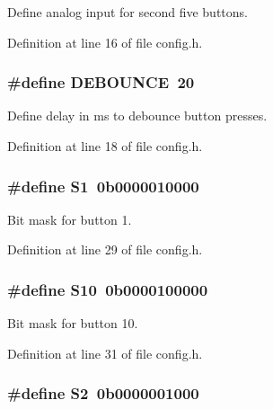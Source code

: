 Define analog input for second five buttons. 



Definition at line 16 of file config.\+h.

\subsubsection[{\texorpdfstring{D\+E\+B\+O\+U\+N\+CE}{DEBOUNCE}}]{\setlength{\rightskip}{0pt plus 5cm}\#define D\+E\+B\+O\+U\+N\+CE~20}\hypertarget{group__buttons_ga171ef18ea7b584f85234640a918da857}{}\label{group__buttons_ga171ef18ea7b584f85234640a918da857}


Define delay in ms to debounce button presses. 



Definition at line 18 of file config.\+h.

\subsubsection[{\texorpdfstring{S1}{S1}}]{\setlength{\rightskip}{0pt plus 5cm}\#define S1~0b0000010000}\hypertarget{group__buttons_ga690d30e9ad3647835c243368b36d4c41}{}\label{group__buttons_ga690d30e9ad3647835c243368b36d4c41}


Bit mask for button 1. 



Definition at line 29 of file config.\+h.

\subsubsection[{\texorpdfstring{S10}{S10}}]{\setlength{\rightskip}{0pt plus 5cm}\#define S10~0b0000100000}\hypertarget{group__buttons_ga1ff88b4fe56e1c80a371b1fbda4e4e74}{}\label{group__buttons_ga1ff88b4fe56e1c80a371b1fbda4e4e74}


Bit mask for button 10. 



Definition at line 31 of file config.\+h.

\subsubsection[{\texorpdfstring{S2}{S2}}]{\setlength{\rightskip}{0pt plus 5cm}\#define S2~0b0000001000}\hypertarget{group__buttons_gad5e70dee3c36d645b0eb1743b8a7d2bf}{}\label{group__buttons_gad5e70dee3c36d645b0eb1743b8a7d2bf}


